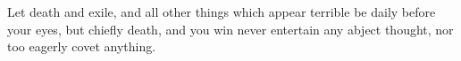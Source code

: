 Let death and exile, and all other things which appear terrible
be daily before your eyes, but chiefly death, and you win never entertain
any abject thought, nor too eagerly covet anything. 
